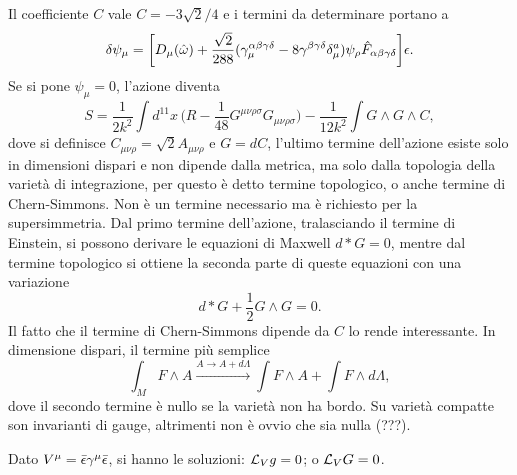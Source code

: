 Il coefficiente $C$ vale $C = -3\sqrt{2}/4$ e i termini da determinare portano a
\begin{equation}
    \delta\psi_\mu = \bigg[D_\mu(\hat{\omega}) + \frac{\sqrt{2}}{288}(\gamma^{\alpha\beta\gamma\delta}_\mu - 8\gamma^{\beta\gamma\delta}\delta^a_\mu)\psi_\rho\hat{F}_{\alpha\beta\gamma\delta}\bigg]\epsilon.
\end{equation}
Se si pone $\psi_\mu = 0$, l'azione diventa 
\begin{equation}
    S = \frac{1}{2k^2}\int d^{11}x\,\bigg(R - \frac{1}{48}G^{\mu\nu\rho\sigma}G_{\mu\nu\rho\sigma}\bigg) - \frac{1}{12k^2}\int G \wedge G \wedge C,
\end{equation}
dove si definisce $C_{\mu\nu\rho} = \sqrt{2}A_{\mu\nu\rho}$ e $G = dC$, l'ultimo termine dell'azione esiste solo in dimensioni dispari e non dipende dalla metrica, ma solo dalla topologia della varietà di integrazione, per questo è detto termine topologico, o anche termine di Chern-Simmons. Non è un termine necessario ma è richiesto per la supersimmetria. Dal primo termine dell'azione, tralasciando il termine di Einstein, si possono derivare le equazioni di Maxwell $d*G = 0$, mentre dal termine topologico si ottiene la seconda parte di queste equazioni con una variazione
\begin{equation}
    d*G + \frac{1}{2} G \wedge G = 0.
\end{equation}
Il fatto che il termine di Chern-Simmons dipende da $C$ lo rende interessante. In dimensione dispari, il termine più semplice 
\begin{equation}
    \int_M F \wedge A \xrightarrow{A \to A + d\Lambda} \int F \wedge A + \int F \wedge d\Lambda,
\end{equation}
dove il secondo termine è nullo se la varietà non ha bordo. Su varietà compatte son invarianti di gauge, altrimenti non è ovvio che sia nulla (???). 

Dato $V^\mu = \bar{\epsilon}\gamma^\mu\bar{\epsilon}$, si hanno le soluzioni: $\mathcal{L}_Vg = 0$; o $\mathcal{L}_VG = 0$. 

